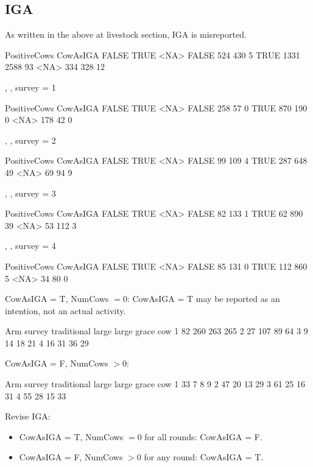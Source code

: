 \subsection{IGA}


As written in the above at livestock section, IGA is misreported. 
\begin{Schunk}
\begin{Soutput}
        PositiveCows
CowAsIGA FALSE TRUE <NA>
   FALSE   524  430    5
   TRUE   1331 2588   93
   <NA>    334  328   12
\end{Soutput}
\begin{Soutput}
, , survey = 1

        PositiveCows
CowAsIGA FALSE TRUE <NA>
   FALSE   258   57    0
   TRUE    870  190    0
   <NA>    178   42    0

, , survey = 2

        PositiveCows
CowAsIGA FALSE TRUE <NA>
   FALSE    99  109    4
   TRUE    287  648   49
   <NA>     69   94    9

, , survey = 3

        PositiveCows
CowAsIGA FALSE TRUE <NA>
   FALSE    82  133    1
   TRUE     62  890   39
   <NA>     53  112    3

, , survey = 4

        PositiveCows
CowAsIGA FALSE TRUE <NA>
   FALSE    85  131    0
   TRUE    112  860    5
   <NA>     34   80    0
\end{Soutput}
\end{Schunk}
\textsf{CowAsIGA} = T, \textsf{NumCows} $=0$: \textsf{CowAsIGA} = T may be reported as an intention, not an actual activity.
\begin{Schunk}
\begin{Soutput}
      Arm
survey traditional large large grace cow
     1          82   260         263 265
     2          27   107          89  64
     3           9    14          18  21
     4          16    31          36  29
\end{Soutput}
\end{Schunk}
\textsf{CowAsIGA} = F, \textsf{NumCows} $>0$: 
\begin{Schunk}
\begin{Soutput}
      Arm
survey traditional large large grace cow
     1          33     7           8   9
     2          47    20          13  29
     3          61    25          16  31
     4          55    28          15  33
\end{Soutput}
\end{Schunk}
Revise IGA:
\begin{itemize}
\vspace{1.0ex}\setlength{\itemsep}{1.0ex}\setlength{\baselineskip}{12pt}
\item	\textsf{CowAsIGA} = T, \textsf{NumCows} $=0$ for all rounds: \textsf{CowAsIGA} = F.
\item	\textsf{CowAsIGA} = F, \textsf{NumCows} $>0$ for any round: \textsf{CowAsIGA} = T.
\end{itemize}

